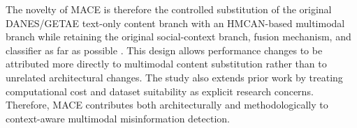The novelty of MACE is therefore the controlled substitution of the original DANES/GETAE text-only content branch with an HMCAN-based multimodal branch while retaining the original social-context branch, fusion mechanism, and classifier as far as possible \citep{truica2024danes,GETAE2025,Qian2021}. This design allows performance changes to be attributed more directly to multimodal content substitution rather than to unrelated architectural changes. The study also extends prior work by treating computational cost and dataset suitability as explicit research concerns. Therefore, MACE contributes both architecturally and methodologically to context-aware multimodal misinformation detection.